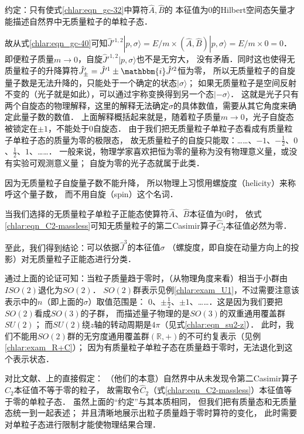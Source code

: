 {{\heiti 约定：}\kaishu 只有使式\eqref{chlar:eqn_gc-32}中算符$\hat{A},\hat{B}$的
	本征值为$0$的Hilbert空间态矢量才能描述自然界中无质量粒子的单粒子态．}

故从式\eqref{chlar:eqn_gc-40}可知$\hat{J}'^{1,2}|p,\sigma\rangle
= E/m \times (\hat{A},\hat{B})|p,\sigma\rangle =E/m \times 0=0$．
即便粒子质量$m\to 0$，自旋$\hat{J}'^{1,2}|p,\sigma\rangle$也不是无穷大，
没有矛盾．同时这也使得无质量粒子的升降算符$\hat{J}' _{\pm}=\hat{J}'^1 \pm\mathbbm{i}\hat{J}'^2$恒为零，
所以无质量粒子的自旋量子数是无法升降的，只能处于一个确定的状态$|\sigma\rangle$；
如果无质量粒子是空间反射不变的（光子就是如此），可以通过宇称变换得到另一个态$|-\sigma\rangle$．
这就是光子只有两个自旋态的物理解释，这里的解释无法确定$\sigma$的具体数值，需要从其它角度来确定此量子数的数值．
上面解释概括起来就是，随着粒子质量$m\to 0$，光子自旋态被锁定在$\pm 1$，不能处于0自旋态．
由于我们把无质量粒子单粒子态看成有质量粒子单粒子态的质量为零的极限态，
故无质量粒子的自旋只能取：……、$-1$、$-\frac{1}{2}$、$0$、$\frac{1}{2}$、$1$、……．
一般来说，物理学家喜欢把恒为零的量称为没有物理意义量，或没有实验可观测意义量；
自旋为零的光子态就属于此类．

因为无质量粒子自旋量子数不能升降，
所以物理上习惯用{\heiti 螺旋度}（helicity）来称呼这个量子数，
而不用自旋（spin）这个名词．


当我们选择的无质量粒子单粒子正能态使算符$\hat{A}$、$\hat{B}$本征值为$0$时，
依式\eqref{chlar:eqn_C2-massless}可知无质量粒子的第二Casimir算子$\hat{C}_2$本征值必然为零．



至此，我们得到结论：{\kaishu 可以依据$\hat{J}^3$的本征值$\sigma$
	（螺旋度，即自旋在动量方向上的投影）对无质量粒子正能态进行分类．}

通过上面的论证可知：当粒子质量趋于零时，（从物理角度来看）相当于小群由$ISO(2)$退化为$SO(2)$．
$SO(2)$群表示见例\ref{chlar:exam_U1}，不过需要注意该表示中的$n$（即上面的$\sigma$）取值范围是：
$0$、$\pm\frac{1}{2}$、$\pm 1$、……．这是因为我们要把$SO(2)$看成$SO(3)$的子群，
而描述量子物理的是$SO(3)$的双重通用覆盖群$SU(2)$；
而$SU(2)$绕$z$轴的转动周期是$4\pi$（见式\eqref{chlar:eqn_su2-z}）．
此时，我们不能用$SO(2)$群的无穷度通用覆盖群$(\mathbb{R},+)$的不可约复表示（见例\ref{chlar:exam_R+C}）；
因为有质量粒子单粒子态在质量趋于零时，无法退化到这个表示状态．


对比文献\parencite[p.72]{weinberg_vol1}、\parencite[p.198]{tung-1985}上的直接假定：
（他们的本意）自然界中从未发现令第二Casimir算子$\hat{C}_2$本征值不等于零的粒子，
故需取令$\hat{C}_2$（式\eqref{chlar:eqn_C2-massless}）本征值等于零的单粒子态．
虽然上面的“约定”与其本质相同，
但我们\cite{liu_ge-2014}把有质量态和无质量态统一到一起表述；
并且清晰地展示出粒子质量趋于零时算符的变化，
此时需要对单粒子态进行限制才能使物理结果合理．

